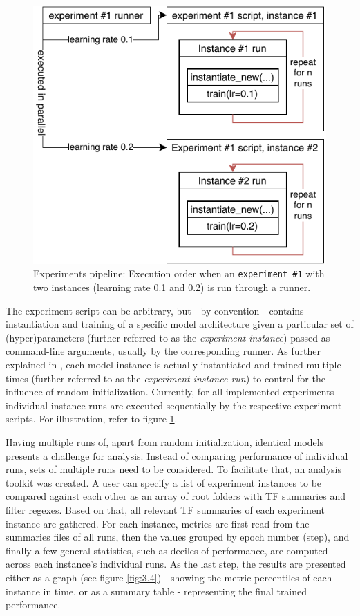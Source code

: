 \begin{figure}[ht]
    \centering
    \includegraphics[]{../figures/03_msc-neuro_1}
    \caption[Experiments pipeline]{Experiments pipeline: Execution order when an \texttt{experiment \#1} with two instances (learning rate 0.1 and 0.2) is run through a runner.}
    \label{fig:3.3}
\end{figure}

The experiment script can be arbitrary, but - by convention - contains instantiation and training of a specific model architecture given a particular set of (hyper)parameters (further referred to as the \textit{experiment instance}) passed as command-line arguments, usually by the corresponding runner. As further explained in , each model instance is actually instantiated and trained multiple times (further referred to as the \textit{experiment instance run}) to control for the influence of random initialization. Currently, for all implemented experiments individual instance runs are executed sequentially by the respective experiment scripts. For illustration, refer to figure \ref{fig:3.3}.

Having multiple runs of, apart from random initialization, identical models presents a challenge for analysis. Instead of comparing performance of individual runs, sets of multiple runs need to be considered. To facilitate that, an analysis toolkit was created. A user can specify a list of experiment instances to be compared against each other as an array of root folders with TF summaries and filter regexes. Based on that, all relevant TF summaries of each experiment instance are gathered. For each instance, metrics are first read from the summaries files of all runs, then the values grouped by epoch number (step), and finally a few general statistics, such as deciles of performance, are computed across each instance’s individual runs. As the last step, the results are presented either as a graph (see figure \ref{fig:3.4}) - showing the metric percentiles of each instance in time, or as a summary table - representing the final trained performance. 

